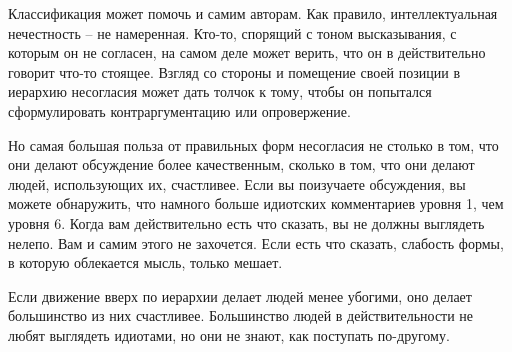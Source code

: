 \documentclass[ebook,12pt,oneside,openany]{memoir}
\begin{document}
Классификация может помочь и самим авторам. Как правило,
интеллектуальная нечестность -- не намеренная. Кто-то, спорящий с
тоном высказывания, с которым он не согласен, на самом деле может
верить, что он в действительно говорит что-то стоящее. Взгляд со
стороны и помещение своей позиции в иерархию несогласия может дать
толчок к тому, чтобы он попытался сформулировать контраргументацию или
опровержение.

Но самая большая польза от правильных форм несогласия не столько в
том, что они делают обсуждение более качественным, сколько в том, что
они делают людей, использующих их, счастливее. Если вы поизучаете
обсуждения, вы можете обнаружить, что намного больше идиотских
комментариев уровня 1, чем уровня 6. Когда вам действительно есть что
сказать, вы не должны выглядеть нелепо. Вам и самим этого не
захочется. Если есть что сказать, слабость формы, в которую облекается
мысль, только мешает.

Если движение вверх по иерархии делает людей менее убогими, оно делает
большинство из них счастливее. Большинство людей в действительности не
любят выглядеть идиотами, но они не знают, как поступать по-другому.
\end{document}
